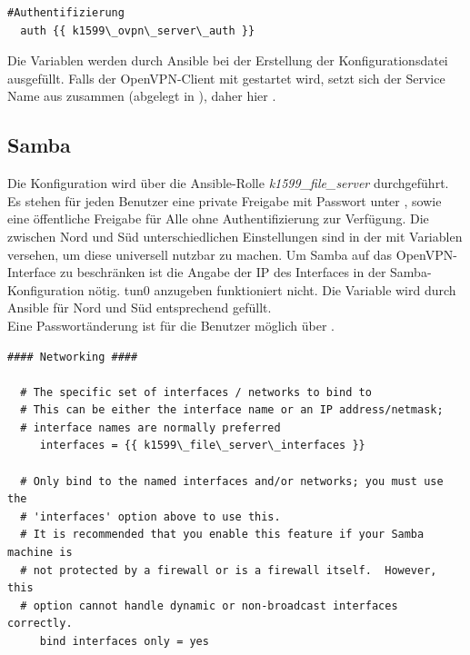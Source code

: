 \begin{lstlisting}[label=code:authmethod,caption=Authentifizierungsmethode]
  #Authentifizierung
  auth {{ k1599\_ovpn\_server\_auth }}
\end{lstlisting}

Die Variablen  werden durch Ansible bei der Erstellung der Konfigurationsdatei ausgefüllt. Falls der OpenVPN-Client mit  gestartet wird, setzt sich der Service Name aus  zusammen (abgelegt in ), daher hier .

\subsection{Samba}
Die Konfiguration wird über die Ansible-Rolle \textit{k1599\_file\_server} durchgeführt. Es stehen für jeden Benutzer eine private Freigabe mit Passwort unter , sowie eine öffentliche Freigabe  für Alle ohne Authentifizierung zur Verfügung. Die zwischen Nord und Süd unterschiedlichen Einstellungen sind in der  mit Variablen versehen, um diese universell nutzbar zu machen. Um Samba auf das OpenVPN-Interface zu beschränken ist die Angabe der IP des Interfaces in der Samba-Konfiguration nötig. tun0 anzugeben funktioniert nicht. Die Variable wird durch Ansible für Nord und Süd entsprechend gefüllt.\\

Eine Passwortänderung ist für die Benutzer möglich über
.

\begin{lstlisting}[label=code:smbconf1,caption=Ausschnitt aus /etc/samba/smb.conf]
  #### Networking ####

  # The specific set of interfaces / networks to bind to
  # This can be either the interface name or an IP address/netmask;
  # interface names are normally preferred
     interfaces = {{ k1599\_file\_server\_interfaces }}

  # Only bind to the named interfaces and/or networks; you must use the
  # 'interfaces' option above to use this.
  # It is recommended that you enable this feature if your Samba machine is
  # not protected by a firewall or is a firewall itself.  However, this
  # option cannot handle dynamic or non-broadcast interfaces correctly.
     bind interfaces only = yes
\end{lstlisting}

